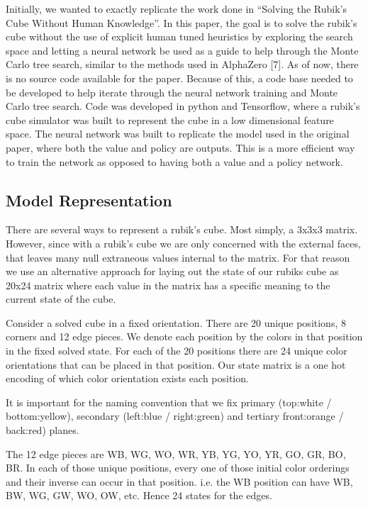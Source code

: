 \documentclass[10pt,twocolumn,letterpaper]{article}
\begin{document}
Initially, we wanted to exactly replicate the work done in “Solving the Rubik’s Cube Without Human Knowledge”. In this paper, the goal is to solve the rubik's cube without the use of explicit human tuned heuristics by exploring the search space and letting a neural network be used as a guide to help through the Monte Carlo tree search, similar to the methods used in AlphaZero [7]. As of now, there is no source code available for the paper. Because of this, a code base needed to be developed to help iterate through the neural network training and Monte Carlo tree search. Code was developed in python and Tensorflow, where a rubik's cube simulator was built to represent the cube in a low dimensional feature space. The neural network was built to replicate the model used in the original paper, where both the value and policy are outputs. This is a more efficient way to train the network as opposed to having both a value and a policy network.

\subsection{Model Representation}
There are several ways to represent a rubik's cube.  Most simply, a 3x3x3 matrix.  However, since with a rubik's cube we are only concerned with the external faces, that leaves many null extraneous values internal to the matrix.   For that reason we use an alternative approach for laying out the state of our rubiks cube as 20x24 matrix where each value in the matrix has a specific meaning to the current state of the cube. 

Consider a solved cube in a fixed orientation.  There are 20 unique positions, 8 corners and 12 edge pieces.  We denote each position by the colors in that position in the fixed solved state.  For each of the 20 positions there are 24 unique color orientations that can be placed in that position.  Our state matrix is a one hot encoding of which color orientation exists each position. 

It is important for the naming convention that we fix primary (top:white / bottom:yellow), secondary (left:blue / right:green) and tertiary front:orange / back:red) planes.  

The 12 edge pieces are WB, WG, WO, WR, YB, YG, YO, YR, GO, GR, BO, BR.  In each of those unique positions, every one of those initial color orderings and their inverse can occur in that position.  i.e. the WB position can have WB, BW, WG, GW, WO, OW, etc.  Hence 24 states for the edges.  
\end{document}
